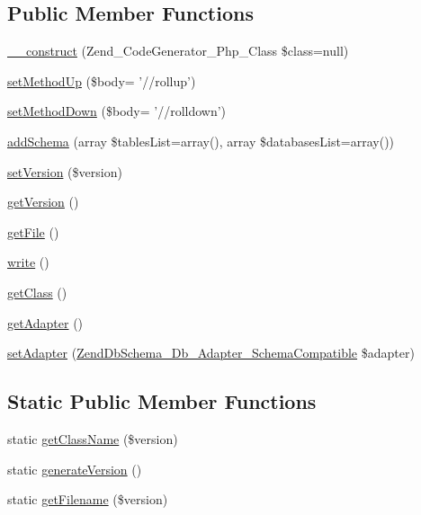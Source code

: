 \subsection*{Public Member Functions}
\begin{DoxyCompactItemize}
\item 
\hyperlink{classZendDbSchema__Db__Migration__Skeleton_a9cca04ca87612733692005f53cae10e6}{\-\_\-\-\_\-construct} (Zend\-\_\-\-Code\-Generator\-\_\-\-Php\-\_\-\-Class \$class=null)
\item 
\hyperlink{classZendDbSchema__Db__Migration__Skeleton_a54863ab7a0d3e0c7c2492ced1507c42b}{set\-Method\-Up} (\$body= '//rollup')
\item 
\hyperlink{classZendDbSchema__Db__Migration__Skeleton_a696ff29e0bfca02bd31d6c4e82af58f7}{set\-Method\-Down} (\$body= '//rolldown')
\item 
\hyperlink{classZendDbSchema__Db__Migration__Skeleton_a58a0cbc3ea2139c107db1c19d4a6b60d}{add\-Schema} (array \$tables\-List=array(), array \$databases\-List=array())
\item 
\hyperlink{classZendDbSchema__Db__Migration__Skeleton_a7613e2ec6a61b621fd7897a29934269d}{set\-Version} (\$version)
\item 
\hyperlink{classZendDbSchema__Db__Migration__Skeleton_afb677840482d948597ec10dc0fd37aab}{get\-Version} ()
\item 
\hyperlink{classZendDbSchema__Db__Migration__Skeleton_a061e25b67825b88e94acf79944db19a6}{get\-File} ()
\item 
\hyperlink{classZendDbSchema__Db__Migration__Skeleton_a71668c68edcf35f36f111963a9b625df}{write} ()
\item 
\hyperlink{classZendDbSchema__Db__Migration__Skeleton_a9d8f00f78a02bdc4e028a210c2797c62}{get\-Class} ()
\item 
\hyperlink{classZendDbSchema__Db__Migration__Skeleton_a1d08bca816aaff3ac27087d5e5daa2ff}{get\-Adapter} ()
\item 
\hyperlink{classZendDbSchema__Db__Migration__Skeleton_aa36d3a36801a4fe2dc5369f4fe68a516}{set\-Adapter} (\hyperlink{interfaceZendDbSchema__Db__Adapter__SchemaCompatible}{Zend\-Db\-Schema\-\_\-\-Db\-\_\-\-Adapter\-\_\-\-Schema\-Compatible} \$adapter)
\end{DoxyCompactItemize}
\subsection*{Static Public Member Functions}
\begin{DoxyCompactItemize}
\item 
static \hyperlink{classZendDbSchema__Db__Migration__Skeleton_a5846d949a449ef981b1c1e1be9eed03a}{get\-Class\-Name} (\$version)
\item 
static \hyperlink{classZendDbSchema__Db__Migration__Skeleton_a51234b84a2f9886f3e08d63519a6eb9d}{generate\-Version} ()
\item 
static \hyperlink{classZendDbSchema__Db__Migration__Skeleton_a1dabe0c3a95ba3b2f0a479ff1eee3351}{get\-Filename} (\$version)
\end{DoxyCompactItemize}
